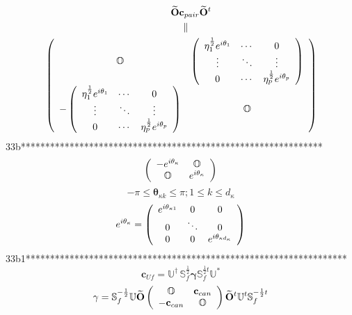 \documentclass[aps,preprint]{revtex4}%
\begin{document}
\begin{align*}
&  \qquad\qquad\qquad\qquad\qquad\qquad\quad\widetilde{\mathbf{O}}%
\mathbf{c}_{pair}\widetilde{\mathbf{O}}^{t}\\
&  \qquad\qquad\qquad\qquad\qquad\qquad\qquad\parallel\\
&  \left(
\begin{array}
[c]{cc}%
\mathbb{O} & \left(
\begin{array}
[c]{ccc}%
\eta_{1}^{\frac{1}{2}}e^{i\mathbf{\theta}_{1}} & \cdots & 0\\
\vdots & \ddots & \vdots\\
0 & \cdots & \eta_{p}^{\frac{1}{2}}e^{i\mathbf{\theta}_{p}}%
\end{array}
\right) \\
-\left(
\begin{array}
[c]{ccc}%
\eta_{1}^{\frac{1}{2}}e^{i\mathbf{\theta}_{1}} & \cdots & 0\\
\vdots & \ddots & \vdots\\
0 & \cdots & \eta_{p}^{\frac{1}{2}}e^{i\mathbf{\theta}_{p}}%
\end{array}
\right)  & \mathbb{O}%
\end{array}
\right)
\end{align*}
33b**************************************************************%
\[
\left(
\begin{array}
[c]{cc}%
-e^{i\mathbf{\theta}_{\kappa}} & \mathbb{O}\\
\mathbb{O} & e^{i\mathbf{\theta}_{\kappa}}%
\end{array}
\right)
\]%
\[
-\pi\leq\mathbf{\theta}_{\kappa k}\leq\pi;1\leq k\leq d_{\kappa}%
\]%
\[
e^{i\mathbf{\theta}_{\kappa}}=\left(
\begin{array}
[c]{ccc}%
e^{i\mathbf{\theta}_{\kappa1}} & 0 & 0\\
0 & \ddots & 0\\
0 & 0 & e^{i\mathbf{\theta}_{\kappa d_{\kappa}}}%
\end{array}
\right)
\]
33b1******************************************************************%
\[
\mathbf{c}_{Uf}=\mathbb{U}^{\dagger}\,\mathbb{S}_{f}^{\frac{1}{2}%
}\mathbf{\gamma}\mathbb{S}_{f}^{\frac{1}{2}t}\mathbb{U}^{\ast}%
\]%
\[
\mathbf{\gamma}=\mathbb{S}_{f}^{-\frac{1}{2}}\mathbb{U}\widetilde{\mathbf{O}%
}\left(
\begin{array}
[c]{cc}%
\mathbb{O} & \mathbf{c}_{can}\\
-\mathbf{c}_{can} & \mathbb{O}%
\end{array}
\right)  \widetilde{\mathbf{O}}^{t}\mathbb{U}^{t}\mathbb{S}_{f}^{-\frac{1}%
{2}t}%
\]%
\end{document}

